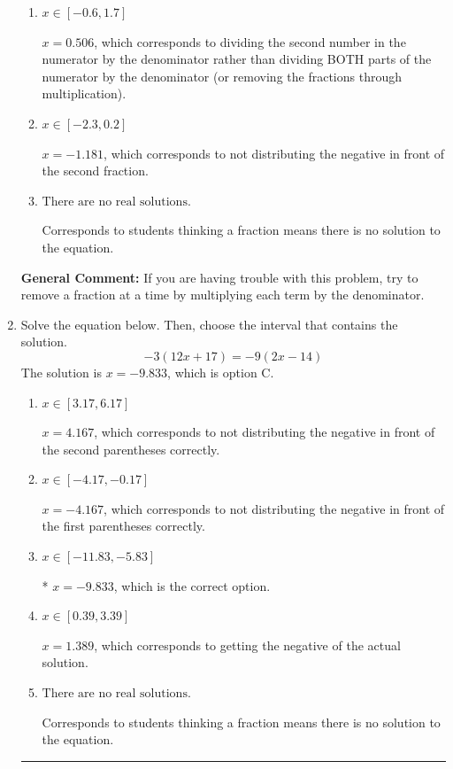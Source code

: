 \documentclass{extbook}[14pt]
\newcommand{\litem}[1]{\item #1

\rule{\textwidth}{0.4pt}}
\begin{document}
\begin{enumerate}
{\begin{enumerate}[label=\Alph*.]
 $x = 6.506$, which corresponds to dividing the coefficients in front of x by the denominator rather than dividing BOTH parts of the numerator by the denominator (or removing the fractions through multiplication).
\item \( x \in [-0.6, 1.7] \)

 $x = 0.506$, which corresponds to dividing the second number in the numerator by the denominator rather than dividing BOTH parts of the numerator by the denominator (or removing the fractions through multiplication).
\item \( x \in [-2.3, 0.2] \)

 $x = -1.181$, which corresponds to not distributing the negative in front of the second fraction.
\item \( \text{There are no real solutions.} \)

Corresponds to students thinking a fraction means there is no solution to the equation.
\end{enumerate}

\textbf{General Comment:} If you are having trouble with this problem, try to remove a fraction at a time by multiplying each term by the denominator.
}
\litem{
Solve the equation below. Then, choose the interval that contains the solution.
\[ -3(12x + 17) = -9(2x -14) \]The solution is \( x = -9.833 \), which is option C.\begin{enumerate}[label=\Alph*.]
\item \( x \in [3.17, 6.17] \)

$x = 4.167$, which corresponds to not distributing the negative in front of the second parentheses correctly.
\item \( x \in [-4.17, -0.17] \)

$x = -4.167$, which corresponds to not distributing the negative in front of the first parentheses correctly.
\item \( x \in [-11.83, -5.83] \)

* $x = -9.833$, which is the correct option.
\item \( x \in [0.39, 3.39] \)

$x = 1.389$, which corresponds to getting the negative of the actual solution.
\item \( \text{There are no real solutions.} \)

Corresponds to students thinking a fraction means there is no solution to the equation.
\end{enumerate}

}
\end{enumerate}
\end{document}
